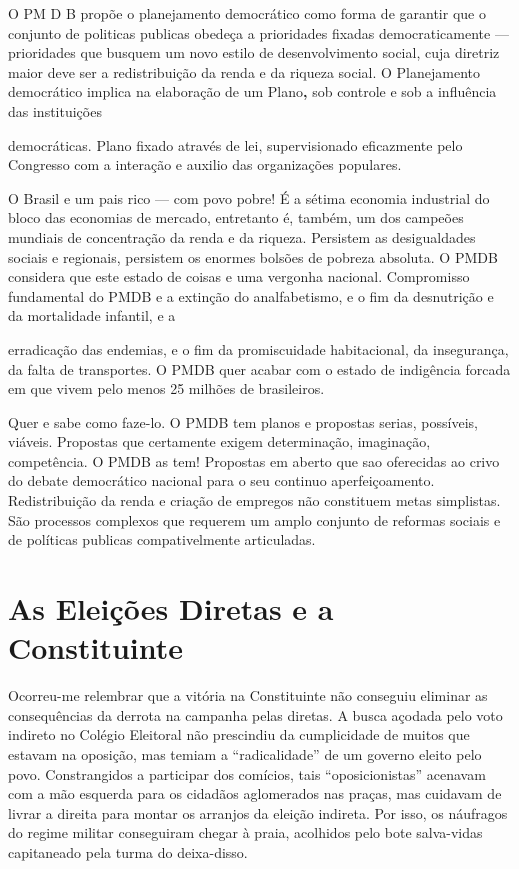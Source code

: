 O PM D B propõe o planejamento democrático como forma de garantir que o
conjunto de politicas publicas obedeça a prioridades fixadas
democraticamente --- prioridades que busquem um novo estilo de
desenvolvimento social, cuja diretriz maior deve ser a redistribuição da
renda e da riqueza social. O Planejamento democrático implica na
elaboração de um Plano\textbf{,} sob controle e sob a influência das
instituições

democráticas. Plano fixado através de lei, supervisionado eficazmente
pelo Congresso com a interação e auxilio das organizações populares.

O Brasil e um pais rico --- com povo pobre! É a sétima economia
industrial do bloco das economias de mercado, entretanto é, também, um
dos campeões mundiais de concentração da renda e da riqueza. Persistem
as desigualdades sociais e regionais, persistem os enormes bolsões de
pobreza absoluta. O PMDB considera que este estado de coisas e uma
vergonha nacional. Compromisso fundamental do PMDB e a extinção do
analfabetismo, e o fim da desnutrição e da mortalidade infantil, e a

erradicação das endemias, e o fim da promiscuidade habitacional, da
insegurança, da falta de transportes. O PMDB quer acabar com o estado de
indigência forcada em que vivem pelo menos 25 milhões de brasileiros.

Quer e sabe como faze-lo. O PMDB tem planos e propostas serias,
possíveis, viáveis. Propostas que certamente exigem determinação,
imaginação, competência. O PMDB as tem! Propostas em aberto que sao
oferecidas ao crivo do debate democrático nacional para o seu continuo
aperfeiçoamento. Redistribuição da renda e criação de empregos não
constituem metas simplistas. São processos complexos que requerem um
amplo conjunto de reformas sociais e de políticas publicas
compativelmente articuladas.

\section{As Eleições Diretas e a Constituinte}

Ocorreu-me relembrar que a vitória na Constituinte não conseguiu
eliminar as consequências da derrota na campanha pelas diretas. A busca
açodada pelo voto indireto no Colégio Eleitoral não prescindiu da
cumplicidade de muitos que estavam na oposição, mas temiam a
``radicalidade'' de um governo eleito pelo povo. Constrangidos a
participar dos comícios, tais ``oposicionistas'' acenavam com a mão
esquerda para os cidadãos aglomerados nas praças, mas cuidavam de livrar
a direita para montar os arranjos da eleição indireta. Por isso, os
náufragos do regime militar conseguiram chegar à praia, acolhidos pelo
bote salva-vidas capitaneado pela turma do deixa-disso.

